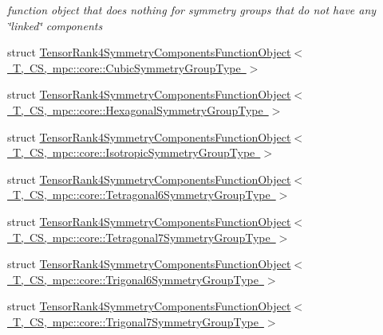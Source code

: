 \begin{DoxyCompactItemize}
\begin{DoxyCompactList}\small\item\em function object that does nothing for symmetry groups that do not have any \char`\"{}linked\char`\"{} components \end{DoxyCompactList}\item 
struct \mbox{\hyperlink{structmpc_1_1core_1_1_tensor_rank4_symmetry_components_function_object_3_01_t_00_01_c_s_00_01mpcb78f8bb4486f797b17b937e5288b806c}{Tensor\+Rank4\+Symmetry\+Components\+Function\+Object$<$ T, C\+S, mpc\+::core\+::\+Cubic\+Symmetry\+Group\+Type $>$}}
\item 
struct \mbox{\hyperlink{structmpc_1_1core_1_1_tensor_rank4_symmetry_components_function_object_3_01_t_00_01_c_s_00_01mpc53006a57374f233daf45c7959ab92c1e}{Tensor\+Rank4\+Symmetry\+Components\+Function\+Object$<$ T, C\+S, mpc\+::core\+::\+Hexagonal\+Symmetry\+Group\+Type $>$}}
\item 
struct \mbox{\hyperlink{structmpc_1_1core_1_1_tensor_rank4_symmetry_components_function_object_3_01_t_00_01_c_s_00_01mpc03d1a1424526d21cea036884c5bccc6f}{Tensor\+Rank4\+Symmetry\+Components\+Function\+Object$<$ T, C\+S, mpc\+::core\+::\+Isotropic\+Symmetry\+Group\+Type $>$}}
\item 
struct \mbox{\hyperlink{structmpc_1_1core_1_1_tensor_rank4_symmetry_components_function_object_3_01_t_00_01_c_s_00_01mpcb35265619212e0eab46a619a1df412a3}{Tensor\+Rank4\+Symmetry\+Components\+Function\+Object$<$ T, C\+S, mpc\+::core\+::\+Tetragonal6\+Symmetry\+Group\+Type $>$}}
\item 
struct \mbox{\hyperlink{structmpc_1_1core_1_1_tensor_rank4_symmetry_components_function_object_3_01_t_00_01_c_s_00_01mpc63de79cc64d05f6df7e125399a852032}{Tensor\+Rank4\+Symmetry\+Components\+Function\+Object$<$ T, C\+S, mpc\+::core\+::\+Tetragonal7\+Symmetry\+Group\+Type $>$}}
\item 
struct \mbox{\hyperlink{structmpc_1_1core_1_1_tensor_rank4_symmetry_components_function_object_3_01_t_00_01_c_s_00_01mpc8f8b6e3c3ae3ae919d47d056c15bff9d}{Tensor\+Rank4\+Symmetry\+Components\+Function\+Object$<$ T, C\+S, mpc\+::core\+::\+Trigonal6\+Symmetry\+Group\+Type $>$}}
\item 
struct \mbox{\hyperlink{structmpc_1_1core_1_1_tensor_rank4_symmetry_components_function_object_3_01_t_00_01_c_s_00_01mpca23658bf2b744d8bf6fc9ed168789069}{Tensor\+Rank4\+Symmetry\+Components\+Function\+Object$<$ T, C\+S, mpc\+::core\+::\+Trigonal7\+Symmetry\+Group\+Type $>$}}
\item 

\end{DoxyCompactItemize}
